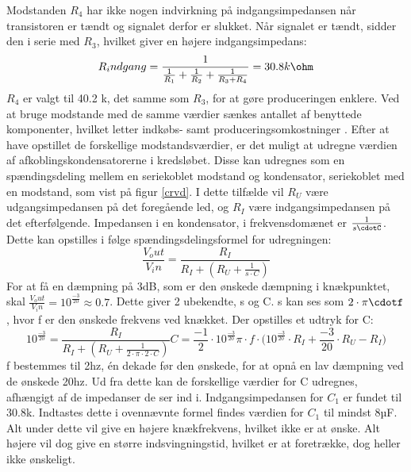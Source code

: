 Modstanden $R_4$ har ikke nogen indvirkning på indgangsimpedansen når transistoren er tændt og signalet derfor er slukket. Når signalet er tændt, sidder den i serie med $R_3$, hvilket giver en højere indgangsimpedans:
\begin{equation}
R_indgang=\frac{1}{\frac{1}{R_1}+\frac{1}{R_2}+\frac{1}{R_3+R_4}}=30.8k\ohm
\end{equation}
$R_4$ er valgt til 40.2 k\ohm, det samme som $R_3$, for at gøre produceringen enklere. Ved at bruge modstande med de samme værdier sænkes antallet af benyttede komponenter, hvilket letter indkøbs- samt produceringsomkostninger .
Efter at have opstillet de forskellige modstandsværdier, er det muligt at udregne værdien af afkoblingskondensatorerne i kredsløbet. Disse kan udregnes som en spændingsdeling mellem en seriekoblet modstand og kondensator, seriekoblet med en modstand, som vist på figur \ref{crvd}. I dette tilfælde vil $R_U$ være udgangsimpedansen på det foregående led, og $R_I$ være indgangsimpedansen på det efterfølgende. Impedansen i en kondensator, i frekvensdomænet er $\frac{1}{s\cdotC}$. Dette kan opstilles i følge spændingsdelingsformel for udregningen:
\begin{equation}
\frac{V_out}{V_in}=\frac{R_I}{R_I+(R_U+\frac{1}{s\cdot C})}
\end{equation}
For at få en dæmpning på 3dB, som er den ønskede dæmpning i knækpunktet, skal $\frac{V_out}{V_in}=10^{\frac{-3}{20}}\approx0.7$. 
Dette giver 2 ubekendte, s og C. s kan ses som $2\cdot\pi\cdotf$, hvor f er den ønskede frekvens ved knækket. Der opstilles et udtryk for C:
\begin{equation}
10^{\frac{-3}{20}}=\frac{R_I}{R_I+(R_U+\frac{1}{2\cdot\pi\cdot 2\cdot C})}
C=\frac{-1}{2}\cdot{10^{\frac{-3}{20}}}{\pi\cdot f\cdot(10^{\frac{-3}{20}}\cdot R_I+\frac{-3}{20}}\cdot R_U - R_I)
\end{equation}
f bestemmes til 2hz, én dekade før den ønskede, for at opnå en lav dæmpning ved de ønskede 20hz. Ud fra dette kan de forskellige værdier for C udregnes, afhængigt af de impedanser de ser ind i.
Indgangsimpedansen for $C_1$ er fundet til 30.8k\ohm . Indtastes dette i ovennævnte formel findes værdien for $C_1$ til mindst 8µF. Alt under dette vil give en højere knækfrekvens, hvilket ikke er at ønske. Alt højere vil dog give en større indsvingningstid, hvilket er at foretrække, dog heller ikke ønskeligt.